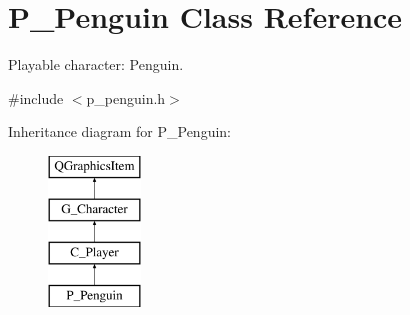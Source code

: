\hypertarget{class_p___penguin}{}\section{P\+\_\+\+Penguin Class Reference}
\label{class_p___penguin}


Playable character\+: Penguin.  




{\ttfamily \#include $<$p\+\_\+penguin.\+h$>$}

Inheritance diagram for P\+\_\+\+Penguin\+:\begin{figure}[H]
\begin{center}
\leavevmode
\includegraphics[height=4.000000cm]{class_p___penguin}
\end{center}
\end{figure}
